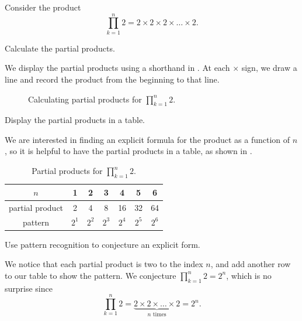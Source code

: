 \begin{exam}
\label{exam_partial_prod_conj_constant}
    Consider the product 
        $$\prod_{k=1}^n 2 =2 \times 2 \times 2 \times \ldots \times 2.$$ 
        
        \begin{apart}
            \item Calculate the partial products.
                \begin{soln}
                    We display the partial products using a shorthand in .  
                    At each $\times$ sign, we draw a line and record the product from the beginning to that line.
                \end{soln}
                
                \begin{figure}[hbtp]
                    \centering
                    \scalebox{0.75}{}
                    \caption{Calculating partial products for $\displaystyle \prod_{k=1}^n2$.}
                    \label{fig_part_products_constant}
                \end{figure}
            \item Display the partial products in a table.
                \begin{soln}
                    We are interested in finding an explicit formula for the product as a function of $n$, so it is helpful to have the partial products in a table, as shown in .
                \end{soln}
                
                \begin{table}[hbtp]
                    \centering
                    \begin{tabular}{c|c|c|c|c|c|c}
                        $n$ & 1 & 2 & 3 & 4 & 5 & 6 \\ \hline
                        partial product & 2 & 4 & 8 & 16 & 32 & 64 \\ \hline
                        pattern & $2^1$ & $2^2$ & $2^3$ & $2^4$ & $2^5$ & $2^6$
                    \end{tabular}
                    \caption{Partial products for $\displaystyle \prod_{k=1}^n2$.}
                    \label{tab_partial_products_constant}
                \end{table}
            \item Use pattern recognition to conjecture an explicit form.
                \begin{soln}
                    We notice that each partial product is two to the index $n$, and add another row to our table to show the pattern.  We conjecture $\displaystyle \prod_{k=1}^n2=2^n$, which is no surprise since
                    $$ \prod_{k=1}^n2 = \underbrace{2 \times 2 \times \ldots \times 2}_{n \text{ times}}=2^n.$$
                \end{soln}
        \end{apart}
\end{exam}

